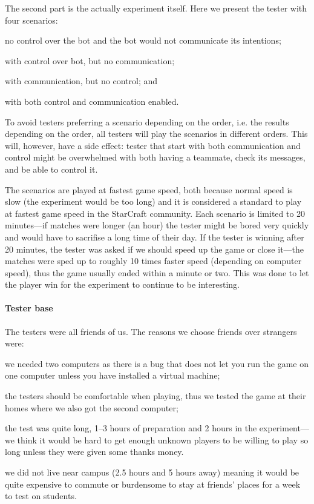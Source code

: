 The second part is the actually experiment itself. Here we present the tester with four scenarios:
\begin{inparaenum}[1\upshape)]
	\item no control over the bot and the bot would not communicate its intentions;
	\item with control over bot, but no communication;
	\item with communication, but no control; and
	\item with both control and communication enabled.
\end{inparaenum}
To avoid testers preferring a scenario depending on the order, i.e. the results depending on the
order, all testers will play the scenarios in different orders. This will, however, have a side effect:
tester that start with both communication and control might be overwhelmed with both having a
teammate, check its messages, and be able to control it.

The scenarios are played at fastest game speed, both because normal speed is slow (the experiment
would be too long) and it is considered a standard to play at fastest game speed in the StarCraft
community. Each scenario is limited to 20 minutes—if matches were longer (an hour) the tester might
be bored very quickly and would have to sacrifise a long time of their day. If the tester is winning
after 20 minutes, the tester was asked if we should speed up the game or close it—the matches were
sped up to roughly 10 times faster speed (depending on computer speed), thus the game usually ended
within a minute or two. This was done to let the player win for the experiment to continue to be
interesting.

\paragraph{Tester base}
The testers were all friends of us. The reasons we choose friends over strangers were:
\begin{inparaenum}[1\upshape)]
	\item we needed two computers as there is a bug that does not let you run the game on one computer
		unless you have installed a virtual machine;
	\item the testers should be comfortable when playing, thus we tested the game at their homes where
		we also got the second computer;
	\item the test was quite long, 1–3 hours of preparation and 2 hours in the experiment—we think it
		would be hard to get enough unknown players to be willing to play so long unless they were given
		some thanks money.
	\item we did not live near campus (2.5 hours and 5 hours away) meaning it would be quite expensive
		to commute or burdensome to stay at friends' places for a week to test on students.
\end{inparaenum}

